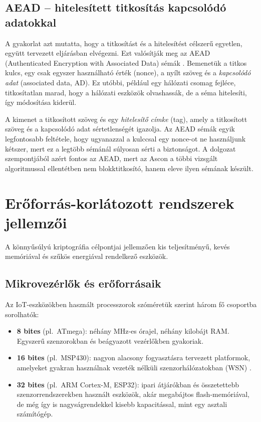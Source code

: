 \documentclass[a4paper,12pt]{report}
\theoremstyle{definition}
\theoremstyle{remark}
\begin{document}
\subsection{AEAD -- hitelesített titkosítás kapcsolódó adatokkal}\label{sec:aead}

A gyakorlat azt mutatta, hogy a titkosítást és a hitelesítést célszerű egyetlen, együtt tervezett eljárásban elvégezni. Ezt valósítják meg az AEAD (Authenticated Encryption with Associated Data) sémák \cite{Dobraunig2021}. Bemenetük a titkos kulcs, egy csak egyszer használható érték (nonce), a nyílt szöveg és a \emph{kapcsolódó adat} (associated data, AD). Ez utóbbi, például egy hálózati csomag fejléce, titkosítatlan marad, hogy a hálózati eszközök olvashassák, de a séma hitelesíti, így módosítása kiderül.

A kimenet a titkosított szöveg és egy \emph{hitelesítő címke} (tag), amely a titkosított szöveg és a kapcsolódó adat sértetlenségét igazolja. Az AEAD sémák egyik legfontosabb feltétele, hogy ugyanazzal a kulccsal egy nonce-ot ne használjunk kétszer, mert ez a legtöbb sémánál súlyosan sérti a biztonságot. A dolgozat szempontjából azért fontos az AEAD, mert az Ascon a többi vizsgált algoritmussal ellentétben nem blokktitkosító, hanem eleve ilyen sémának készült.

\section{Erőforrás-korlátozott rendszerek jellemzői}\label{sec:eroforras}

A könnyűsúlyú kriptográfia célpontjai jellemzően kis teljesítményű, kevés memóriával és szűkös energiával rendelkező eszközök.

\subsection{Mikrovezérlők és erőforrásaik}\label{sec:mikrovezerlok}

Az IoT-eszközökben használt processzorok szóméretük szerint három fő csoportba sorolhatók:
\begin{itemize}
	\item \textbf{8 bites} (pl.~ATmega): néhány MHz-es órajel, néhány kilobájt RAM. Egyszerű szenzorokban és beágyazott vezérlőkben gyakoriak.
	\item \textbf{16 bites} (pl.~MSP430): nagyon alacsony fogyasztásra tervezett platformok, amelyeket gyakran használnak vezeték nélküli szenzorhálózatokban (WSN) \cite{NISTIR8114}.
	\item \textbf{32 bites} (pl.~ARM Cortex-M, ESP32): ipari átjárókban és összetettebb szenzorrendszerekben használt eszközök, akár megabájtos flash-memóriával, de még így is nagyságrendekkel kisebb kapacitással, mint egy asztali számítógép.
\end{itemize}
\end{document}
